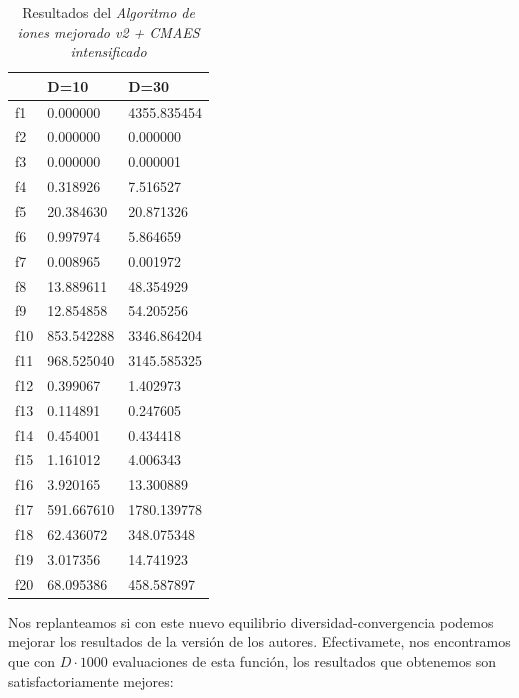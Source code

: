 \documentclass[a4paper,11pt]{article}
\begin{document}
\begin{itemize}
  \begin{table}[H]	
  \caption{Resultados del \textit{Algoritmo de iones mejorado v2 + CMAES intensificado}}
  \centering
  \begin{tabular}{|l|l|l|}
  \hline
  & \textbf{D=10} & \textbf{D=30} \\ \hline
  f1 &  0.000000 &  4355.835454 \\ \hline
  f2 &  0.000000 &  0.000000 \\ \hline
  f3 &  0.000000 &  0.000001 \\ \hline
  f4 &  0.318926 &  7.516527 \\ \hline
  f5 &  20.384630 &  20.871326 \\ \hline
  f6 &  0.997974 &  5.864659 \\ \hline
  f7 &  0.008965 &  0.001972 \\ \hline
  f8 &  13.889611 &  48.354929 \\ \hline
  f9 &  12.854858 &  54.205256 \\ \hline
  f10 &  853.542288 &  3346.864204 \\ \hline
  f11 &  968.525040 &  3145.585325 \\ \hline
  f12 &  0.399067 &  1.402973 \\ \hline
  f13 &  0.114891 &  0.247605 \\ \hline
  f14 &  0.454001 &  0.434418 \\ \hline
  f15 &  1.161012 &  4.006343 \\ \hline
  f16 &  3.920165 &  13.300889 \\ \hline
  f17 &  591.667610 &  1780.139778 \\ \hline
  f18 &  62.436072 &  348.075348 \\ \hline
  f19 &  3.017356 &  14.741923 \\ \hline
  f20 &  68.095386 &  458.587897 \\ \hline
  \end{tabular}
  \label{mejv2}
  \end{table}
  
  Nos replanteamos si con este nuevo equilibrio diversidad-convergencia podemos mejorar los resultados de la versión de los autores.
  Efectivamete, nos encontramos que con $D\cdot 1000$ evaluaciones de esta función, los resultados que obtenemos son satisfactoriamente
  mejores:
  

\end{itemize}
\end{document}
